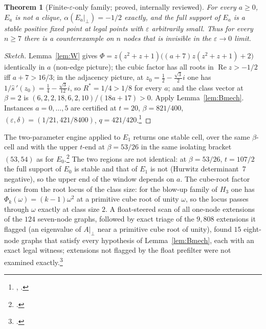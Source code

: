 \documentclass[11pt]{article}
\newtheorem{theorem}{Theorem}[section]
\theoremstyle{definition}
\newcommand{\eps}{\varepsilon}
\newcommand{\perpc}[1]{#1|_{\perp}}
\newcommand{\Rea}{\operatorname{Re}}
\begin{document}
{\begin{theorem}[Finite-$\eps$-only family; proved, internally reviewed]\label{thm:famE}
For every $a\ge0$, $E_a$ is not a clique, $\alpha(\perpc{E_a})=-1/2$ exactly, and the full support of $E_a$ is a stable positive
fixed point at legal points with $\eps$ arbitrarily small. Thus for every $n\ge7$ there is a counterexample on $n$ nodes that
is invisible in the $\eps\to0$ limit.
\end{theorem}
\begin{proof}[Sketch]
Lemma~\ref{lem:W} gives $\Phi=z(z^2+z+1)\bigl((a+7)z(z^2+z+1)+2\bigr)$ identically in $a$ (non-edge picture); the cubic factor has all roots
in $\Rea z>-1/2$ iff $a+7>16/3$; in the adjacency picture, at $z_0=\tfrac12-\tfrac{\sqrt3}{2}i$ one has $1/\hat s\,'(z_0)=\tfrac14-\tfrac{\sqrt3}{12}i$, so $R^*=1/4>1/8$
for every $a$; and the class vector at $\beta=2$ is $(6,2,2,18,6,2,10)/(18a+17)>0$. Apply Lemma~\ref{lem:Bmech}.
Instances $a=0,\dots,5$ are certified at $t=20$, $\beta=821/400$, $(\eps,\delta)=(1/21,421/8400)$, $q=421/420$.\footnote{, .}
\end{proof}
The two-parameter engine applied to $E_1$ returns one stable cell, over the same $\beta$-cell and with the upper $t$-end at
$\beta=53/26$ in the same isolating bracket $(53,54)$ as for $E_0$.\footnote{.} The two
regions are not identical: at $\beta=53/26$, $t=107/2$ the full support of $E_0$ is stable and that of $E_1$ is not (Hurwitz
determinant~7 negative), so the upper end of the window depends on $a$. The cube-root factor arises from the root
locus of the class size: for the blow-up family of $H_3$ one has $\Phi_k(\omega)=(k-1)\omega^2$ at a primitive cube root of
unity $\omega$, so the locus passes through $\omega$ exactly at class size $2$. A float-steered scan of all one-node extensions of the
$124$ seven-node graphs, followed by exact triage of the $9{,}808$ extensions it flagged (an eigenvalue of $\perpc{A}$ near a
primitive cube root of unity), found $15$ eight-node graphs that satisfy every hypothesis of Lemma~\ref{lem:Bmech}, each with an
exact legal witness; extensions not flagged by the float prefilter were not examined exactly.\footnote{.}

}
\end{document}
